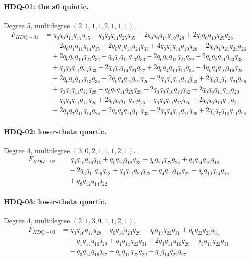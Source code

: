 \paragraph{HDQ-01: theta0 quintic.} Degree 5, multidegree $(2,1,1,1,2,1,1,1)$.
\[\begin{aligned}F_{HDQ-01}&=q_{0}q_{0}q_{11}q_{17}q_{35}-q_{0}q_{0}q_{11}q_{25}q_{35}-2q_{0}q_{0}q_{17}q_{19}q_{28}+2q_{0}q_{0}q_{19}q_{25}q_{28}\\&\quad -2q_{0}q_{1}q_{11}q_{14}q_{35}+2q_{0}q_{1}q_{13}q_{24}q_{33}+4q_{0}q_{1}q_{14}q_{19}q_{28}-2q_{0}q_{1}q_{21}q_{24}q_{26}\\&\quad +2q_{0}q_{2}q_{10}q_{21}q_{32}+q_{0}q_{2}q_{11}q_{17}q_{33}-2q_{0}q_{2}q_{11}q_{21}q_{29}-2q_{0}q_{2}q_{11}q_{23}q_{33}\\&\quad +q_{0}q_{2}q_{11}q_{25}q_{33}-2q_{0}q_{2}q_{14}q_{21}q_{27}+2q_{0}q_{4}q_{10}q_{11}q_{35}-4q_{0}q_{4}q_{10}q_{19}q_{28}\\&\quad -2q_{0}q_{4}q_{12}q_{13}q_{33}+2q_{0}q_{4}q_{12}q_{21}q_{26}-2q_{0}q_{5}q_{11}q_{13}q_{33}+2q_{0}q_{5}q_{11}q_{21}q_{26}\\&\quad +q_{0}q_{7}q_{11}q_{17}q_{28}-q_{0}q_{7}q_{11}q_{25}q_{28}-2q_{0}q_{9}q_{10}q_{13}q_{32}+2q_{0}q_{9}q_{11}q_{13}q_{29}\\&\quad -q_{0}q_{9}q_{11}q_{17}q_{26}+2q_{0}q_{9}q_{11}q_{23}q_{26}-q_{0}q_{9}q_{11}q_{25}q_{26}+2q_{0}q_{9}q_{13}q_{14}q_{27}\\&\quad -2q_{1}q_{7}q_{11}q_{14}q_{28}+2q_{2}q_{3}q_{11}q_{11}q_{33}-2q_{3}q_{9}q_{11}q_{11}q_{26}+2q_{4}q_{7}q_{10}q_{11}q_{28}\end{aligned}\]
\paragraph{HDQ-02: lower-theta quartic.} Degree 4, multidegree $(3,0,2,1,1,1,2,1)$.
\[\begin{aligned}F_{HDQ-02}&=q_{0}q_{15}q_{16}q_{18}+q_{0}q_{16}q_{18}q_{23}-q_{0}q_{20}q_{22}q_{23}+q_{1}q_{14}q_{16}q_{18}\\&\quad -2q_{3}q_{11}q_{16}q_{18}+q_{3}q_{11}q_{20}q_{22}-q_{4}q_{12}q_{18}q_{22}-q_{8}q_{10}q_{14}q_{16}\\&\quad +q_{8}q_{12}q_{14}q_{22}\end{aligned}\]
\paragraph{HDQ-03: lower-theta quartic.} Degree 4, multidegree $(2,1,3,0,1,1,2,1)$.
\[\begin{aligned}F_{HDQ-03}&=q_{0}q_{16}q_{17}q_{29}-q_{0}q_{16}q_{23}q_{29}-q_{0}q_{17}q_{22}q_{31}+q_{0}q_{22}q_{23}q_{31}\\&\quad -q_{1}q_{14}q_{16}q_{29}+q_{1}q_{14}q_{22}q_{31}+2q_{3}q_{11}q_{16}q_{29}-q_{3}q_{11}q_{22}q_{31}\\&\quad -q_{3}q_{14}q_{16}q_{27}-q_{5}q_{11}q_{22}q_{29}+q_{5}q_{14}q_{22}q_{27}\end{aligned}\]
